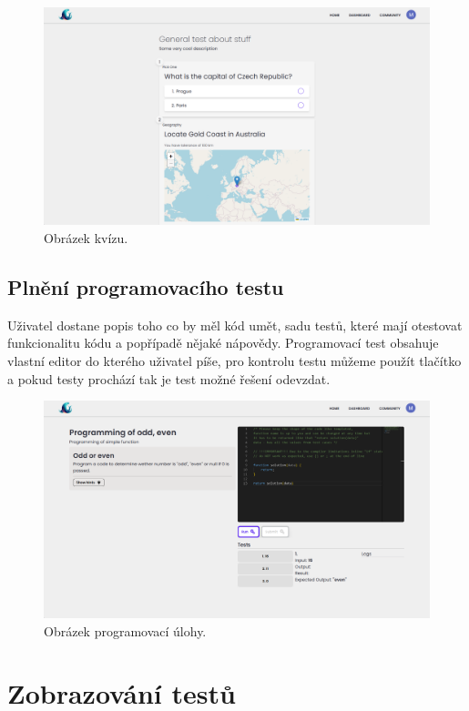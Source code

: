 \documentclass[12pt, a4paper,
openright
]{report}
\begin{document}
\begin{figure}[H]
	\centering %
	\includegraphics[width=0.75\linewidth]{image/test-taking.png} 
	\caption{Obrázek kvízu.} %
	\label{fig:test-taking} %
\end{figure}

\subsection{Plnění programovacího testu}
Uživatel dostane popis toho co by měl kód umět, sadu testů, které mají otestovat funkcionalitu kódu a popřípadě nějaké nápovědy. Programovací test obsahuje vlastní editor do kterého uživatel píše, pro kontrolu testu můžeme použít tlačítko \textit{} a pokud testy prochází tak je test možné řešení odevzdat.

\begin{figure}[H]
	\centering %
	\includegraphics[width=0.75\linewidth]{image/programming.png} 
	\caption{Obrázek programovací úlohy.} %
	\label{fig:programming} %
\end{figure}


\section{Zobrazování testů}
\end{document}
